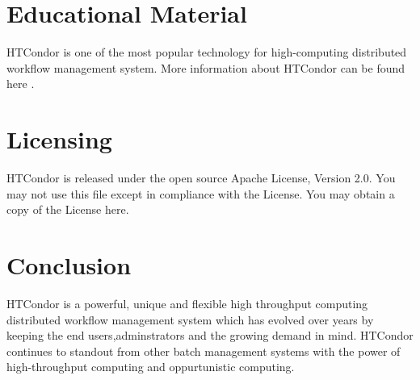 \documentclass[9pt,twocolumn,twoside]{../../styles/osajnl}
\begin{document}
\section{Educational Material}

HTCondor is one of the most popular technology for high-computing
distributed workflow management system. More information about
HTCondor can be found here \cite{HTCondor_website}.

\section{Licensing}

HTCondor is released under the open source Apache License, Version
2.0. You may not use this file except in compliance with the
License. You may obtain a copy of the License
here\cite{HTCondor-License}.

\section{Conclusion}

HTCondor is a powerful, unique and flexible high throughput computing
distributed workflow management system which has evolved over years by
keeping the end users,adminstrators and the growing demand in
mind. HTCondor continues to standout from other batch management
systems with the power of high-throughput computing and oppurtunistic
computing.







\newpage

\appendix
\end{document}
